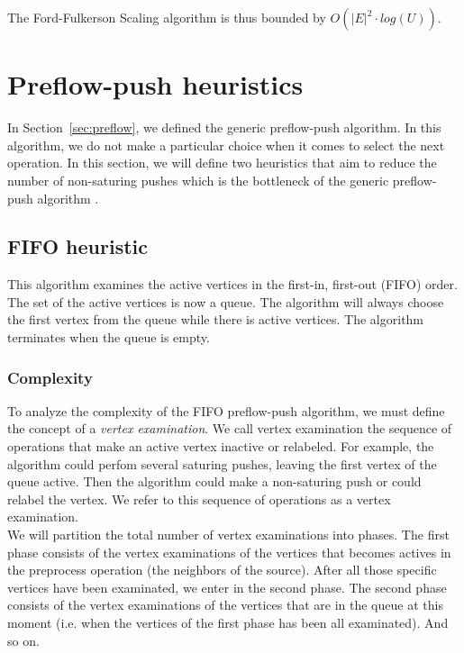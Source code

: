 The Ford-Fulkerson Scaling algorithm is thus bounded by $O(|E|^2 \cdot log(U))$.

\section{Preflow-push heuristics}

In Section~\ref{sec:preflow}, we defined the generic preflow-push algorithm. In this algorithm, we do not make a particular choice when it comes to select the next operation. In this section, we will define two heuristics that aim to reduce the number of non-saturing pushes which is the bottleneck of the generic preflow-push algorithm \cite{networkflows}.

\subsection{FIFO heuristic}

This algorithm examines the active vertices in the first-in, first-out (FIFO) order. The set of the active vertices is now a queue. The algorithm will always choose the first vertex from the queue while there is active vertices. The algorithm terminates when the queue is empty. 

\subsubsection{Complexity}

To analyze the complexity of the FIFO preflow-push algorithm, we must define the concept of a \textit{vertex examination}. We call vertex examination the sequence of operations that make an active vertex inactive or relabeled. For example, the algorithm could perfom several saturing pushes, leaving the first vertex of the queue active. Then the algorithm could make a non-saturing push or could relabel the vertex. We refer to this sequence of operations as a vertex examination.\\

We will partition the total number of vertex examinations into phases. The first phase consists of the vertex examinations of the vertices that becomes actives in the preprocess operation (the neighbors of the source). After all those specific vertices have been examinated, we enter in the second phase. The second phase consists of the vertex examinations of the vertices that are in the queue at this moment (i.e. when the vertices of the first phase has been all examinated). And so on.\\

